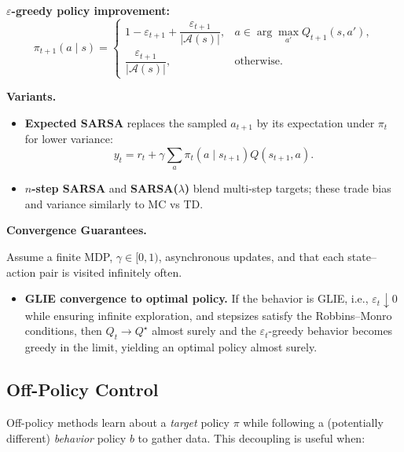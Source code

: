 \documentclass[
]{book}
\providecommand{\tightlist}{%
  \setlength{\itemsep}{0pt}\setlength{\parskip}{0pt}}
\theoremstyle{definition}
\theoremstyle{definition}
\theoremstyle{definition}
\theoremstyle{definition}
\theoremstyle{remark}
\begin{document}
\textbf{\(\varepsilon\)-greedy policy improvement:}
\begin{equation}
\pi_{t+1}(a\mid s) =
\begin{cases}
1-\varepsilon_{t+1} + \dfrac{\varepsilon_{t+1}}{|\mathcal A(s)|}, & a \in \arg\max_{a'} Q_{t+1}(s,a'),\\
\dfrac{\varepsilon_{t+1}}{|\mathcal A(s)|}, & \text{otherwise.}
\end{cases}
\label{eq:SARSA-PolicyUpdate}
\end{equation}

\textbf{Variants.}

\begin{itemize}
\item
  \textbf{Expected SARSA} replaces the sampled \(a_{t+1}\) by its expectation under \(\pi_t\) for lower variance:
  \begin{equation}
  y_t = r_{t} + \gamma \sum_a \pi_t(a\mid s_{t+1}) Q(s_{t+1}, a).
  \label{eq:ExpectedSARSA-Target}
  \end{equation}
\item
  \textbf{\(n\)-step SARSA} and \textbf{SARSA(\(\lambda\))} blend multi-step targets; these trade bias and variance similarly to MC vs TD.
\end{itemize}

\textbf{Convergence Guarantees.}

Assume a finite MDP, \(\gamma \in [0,1)\), asynchronous updates, and that each state--action pair is visited infinitely often.

\begin{itemize}
\tightlist
\item
  \textbf{GLIE convergence to optimal policy.} If the behavior is GLIE, i.e., \(\varepsilon_t \downarrow 0\) while ensuring infinite exploration, and stepsizes satisfy the Robbins--Monro conditions, then \(Q_t \to Q^\star\) almost surely and the \(\varepsilon_t\)-greedy behavior becomes greedy in the limit, yielding an optimal policy almost surely.
\end{itemize}

\subsection{Off-Policy Control}\label{off-policy-control}

Off-policy methods learn about a \emph{target} policy \(\pi\) while following a (potentially different) \emph{behavior} policy \(b\) to gather data. This decoupling is useful when:
\end{document}
